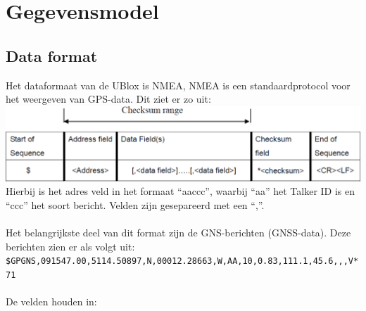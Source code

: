 \section{Gegevensmodel}
\subsection{Data format}
Het dataformaat van de UBlox is NMEA, NMEA is een standaardprotocol voor het
weergeven van GPS-data. Dit ziet er zo uit: \\
\includegraphics[width=\textwidth]{technical/nmea}
\\Hierbij is het adres veld in het formaat ``aaccc'', waarbij ``aa'' het
Talker ID is en ``ccc'' het soort bericht. Velden zijn gesepareerd met
een ``,''. 
\citep{Navspark}\\\\
Het belangrijkste deel van dit format zijn de GNS-berichten
(GNSS-data). Deze berichten zien er als volgt uit:\\
\texttt{\$GPGNS,091547.00,5114.50897,N,00012.28663,W,AA,10,0.83,111.1,45.6,,,V*71}
\\\\
De velden houden in:
\\\\
